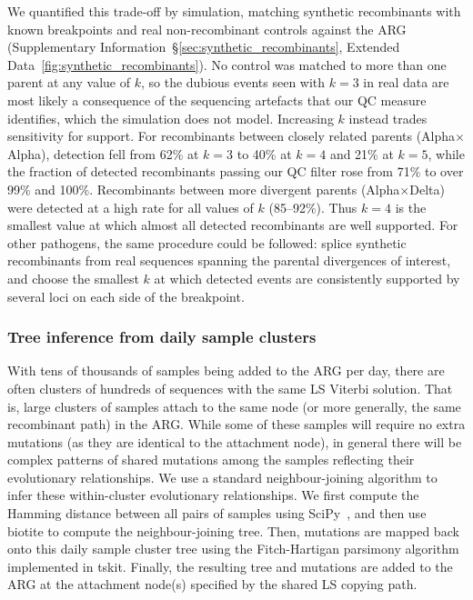 \documentclass[12pt]{article}
\newcommand{\supref}[1]{Supplementary Information~\S\ref{#1}}
\newcommand{\edref}[1]{Extended Data~\ref{#1}}
\begin{document}
We quantified this trade-off by simulation,
matching synthetic recombinants with known breakpoints and
real non-recombinant controls against the ARG
(\supref{sec:synthetic_recombinants}, \edref{fig:synthetic_recombinants}).
No control was matched to more than one parent at any value of $k$,
so the dubious events seen with $k=3$ in real data
are most likely a consequence of the sequencing artefacts
that our QC measure identifies,
which the simulation does not model.
Increasing $k$ instead trades sensitivity for support.
For recombinants between closely related parents (Alpha$\times$Alpha),
detection fell from 62\% at $k=3$ to 40\% at $k=4$ and 21\% at $k=5$,
while the fraction of detected recombinants passing our QC filter
rose from 71\% to over 99\% and 100\%.
Recombinants between more divergent parents (Alpha$\times$Delta)
were detected at a high rate for all values of $k$ (85--92\%).
Thus $k=4$ is the smallest value at which
almost all detected recombinants are well supported.
For other pathogens, the same procedure could be followed:
splice synthetic recombinants from real sequences
spanning the parental divergences of interest,
and choose the smallest $k$ at which detected events
are consistently supported by several loci on each side of the breakpoint.

\subsubsection*{Tree inference from daily sample clusters}
With tens of thousands of samples being added to the ARG per day,
there are often clusters of hundreds of sequences with the same
LS Viterbi solution. That is, large clusters of samples attach
to the same node (or more generally, the same recombinant path)
in the ARG. While some of these samples will require no extra mutations
(as they are identical to the attachment node),
in general there will be complex patterns of shared mutations among the samples
reflecting their evolutionary relationships.
We use a standard neighbour-joining algorithm\cite{Saitou1987}
to infer these within-cluster evolutionary relationships.
We first compute the Hamming distance between
all pairs of samples using SciPy~\cite{Virtanen2020scipy},
and then use biotite\cite{Kunzmann2018biotite,Kunzmann2023biotite}
to compute the neighbour-joining tree.
Then, mutations are mapped back onto this daily sample cluster tree using
the Fitch-Hartigan parsimony
algorithm\cite{Fitch1971toward,Hartigan1973minimum} implemented in tskit.
Finally, the resulting tree and mutations are added to the ARG at the attachment node(s)
specified by the shared LS copying path.
\end{document}
